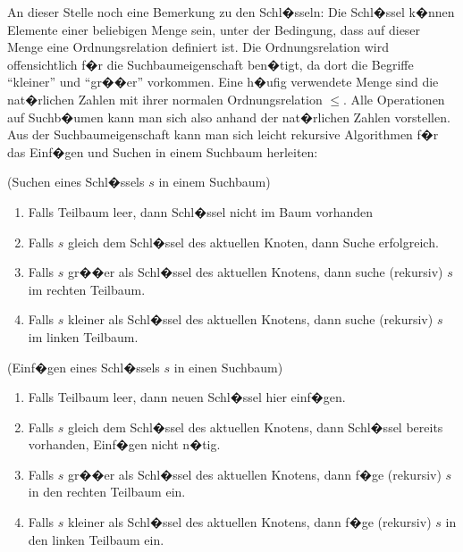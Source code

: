 
An dieser Stelle noch eine Bemerkung zu den Schl�sseln: Die Schl�ssel k�nnen Elemente einer beliebigen Menge sein, unter der Bedingung, dass auf dieser Menge eine Ordnungsrelation definiert ist. Die Ordnungsrelation wird offensichtlich f�r die Suchbaumeigenschaft ben�tigt, da dort die Begriffe "`kleiner"' und "`gr��er"' vorkommen. Eine h�ufig verwendete Menge sind die nat�rlichen Zahlen mit ihrer normalen Ordnungsrelation $\leq$. Alle Operationen auf Suchb�umen kann man sich also anhand der nat�rlichen Zahlen vorstellen.\\
Aus der Suchbaumeigenschaft kann man sich leicht rekursive Algorithmen f�r das Einf�gen und Suchen in einem Suchbaum herleiten:

\begin{alg} \label{search}
	(Suchen eines Schl�ssels $s$ in einem Suchbaum)
	\begin{enumerate}
		\item Falls Teilbaum leer, dann Schl�ssel nicht im Baum vorhanden
		\item Falls $s$ gleich dem Schl�ssel des aktuellen Knoten, dann Suche erfolgreich.
		\item Falls $s$ gr��er als Schl�ssel des aktuellen Knotens, dann suche (rekursiv) $s$ im rechten Teilbaum.
		\item Falls $s$ kleiner als Schl�ssel des aktuellen Knotens, dann suche (rekursiv) $s$ im linken Teilbaum.
	\end {enumerate}
\end{alg}

\newpage
\begin{alg} \label{insert}
	(Einf�gen eines Schl�ssels $s$ in einen Suchbaum)
	\begin {enumerate}
		\item Falls Teilbaum leer, dann neuen Schl�ssel hier einf�gen.
		\item Falls $s$ gleich dem Schl�ssel des aktuellen Knotens, dann Schl�ssel bereits vorhanden, Einf�gen nicht n�tig.
		\item Falls $s$ gr��er als Schl�ssel des aktuellen Knotens, dann f�ge (rekursiv) $s$ in den rechten Teilbaum ein.
		\item Falls $s$ kleiner als Schl�ssel des aktuellen Knotens, dann f�ge (rekursiv) $s$ in den linken Teilbaum ein.
	\end {enumerate}
\end{alg}

